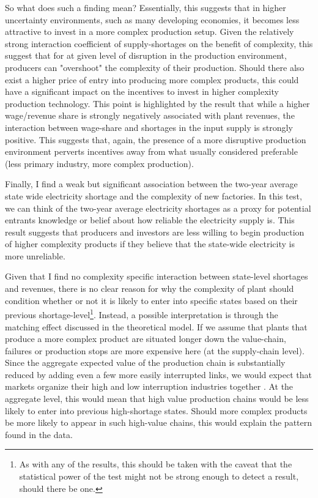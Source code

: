 \documentclass[11pt]{article}
\begin{document}
So what does such a finding mean? Essentially, this suggests that in higher uncertainty environments, such as many developing economies, it becomes less attractive to invest in a more complex production setup. Given the relatively strong interaction coefficient of supply-shortages on the benefit of complexity, this suggest that for at given level of disruption in the production environment, producers can "overshoot" the complexity of their production. Should there also exist a higher price of entry into producing more complex products, this could have a significant impact on the incentives to invest in higher complexity production technology. This point is highlighted by the result that while a higher wage/revenue share is strongly negatively associated with plant revenues, the interaction between wage-share and shortages in the input supply is strongly positive. This suggests that, again, the presence of a more disruptive production environment perverts incentives away from what usually considered preferable (less primary industry, more complex production). 

Finally, I find a weak but significant association between the two-year average state wide electricity shortage and the complexity of new factories. In this test, we can think of the two-year average electricity shortages as a proxy for potential entrants knowledge or belief about how reliable the electricity supply is. This result suggests that producers and investors are less willing to begin production of higher complexity products if they believe that the state-wide electricity is more unreliable.

Given that I find no complexity specific interaction between state-level shortages and revenues, there is no clear reason for why the complexity of plant should condition whether or not it is likely to enter into specific states based on their previous shortage-level\footnote{As with any of the results, this should be taken with the caveat that the statistical power of the test might not be strong enough to detect a result, should there be one.}. Instead, a possible interpretation is through the matching effect discussed in the theoretical model. If we assume that plants that produce a more complex product are situated longer down the value-chain, failures or production stops are more expensive here (at the supply-chain level). Since the aggregate expected value of the production chain is substantially reduced by adding even a few more easily interrupted links, we would expect that markets organize their high and low interruption industries together \citep{kremer_o-ring_1993}. At the aggregate level, this would mean that high value production chains would be less likely to enter into previous high-shortage states. Should more complex products be more likely to appear in such high-value chains, this would explain the pattern found in the data.
\end{document}
